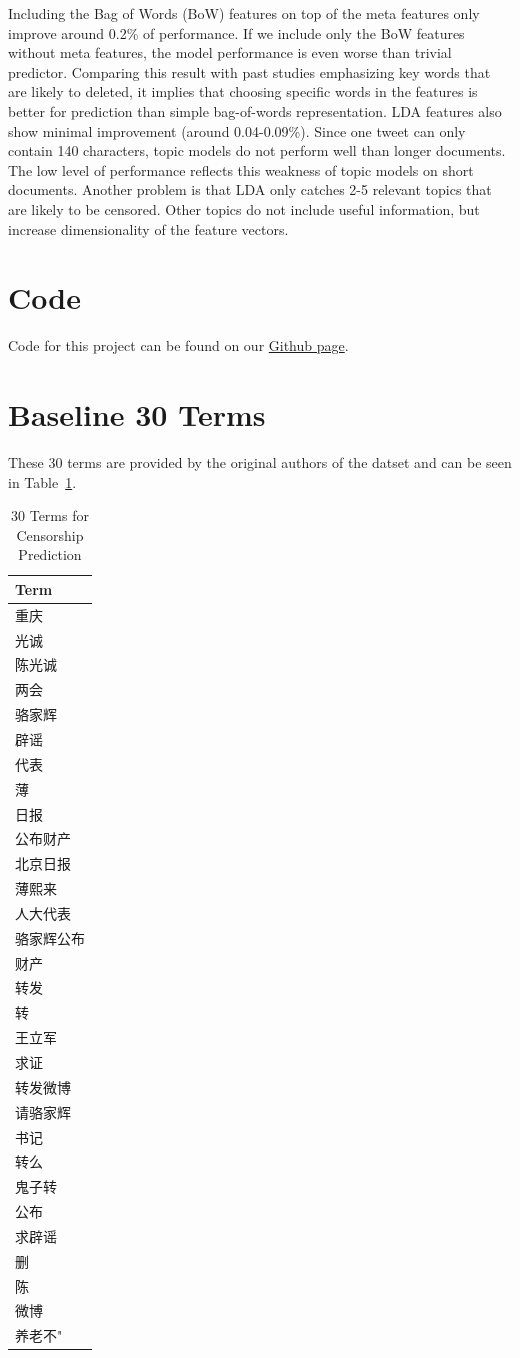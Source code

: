 \documentclass{sig-alternate-05-2015}
\begin{document}
Including the Bag of Words (BoW) features on top of the meta features only improve around 0.2\% of performance. If we include only the BoW features without meta features, the model performance is even worse than trivial predictor. Comparing this result with past studies emphasizing key words that are likely to deleted, it implies that choosing specific words in the features is better for prediction than simple bag-of-words representation. LDA features also show minimal improvement (around 0.04-0.09\%). Since one tweet can only contain 140 characters, topic models do not perform well than longer documents. The low level of performance reflects this weakness of topic models on short documents. Another problem is that LDA only catches 2-5 relevant topics that are likely to be censored. Other topics do not include useful information, but increase dimensionality of the feature vectors. 



\appendix
\section{Code}
Code for this project can be found on our \href{https://github.com/brtsay/CSE190_Assignment2}{Github page}.
\section{Baseline 30 Terms}
These 30 terms are provided by the original authors of the datset and can be seen in Table~\ref{tab:terms}\cite{Fu2013a}.
\begin{table}
  \centering
  \begin{tabular}{l}
    Term \\
    \hline
    重庆\\光诚\\陈光诚\\两会\\骆家辉\\辟谣\\代表\\薄\\日报\\公布财产\\北京日报\\薄熙来\\人大代表\\骆家辉公布\\财产\\转发\\转\\王立军\\求证\\转发微博\\请骆家辉\\书记\\转么\\鬼子转\\公布\\求辟谣\\删\\陈\\微博\\养老不"
  \end{tabular}
  \caption{30 Terms for Censorship Prediction}
  \label{tab:terms}
\end{table}
\end{document}
